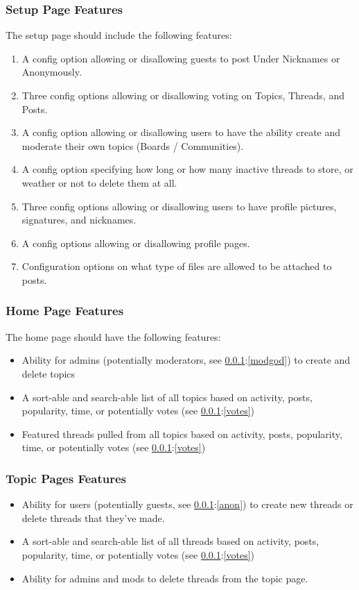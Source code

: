 \documentclass[]{article}
\begin{document}
\subsubsection{Setup Page Features}\label{setup}
The setup page should include the following features:
\begin{enumerate}
    \item \label{anon} A config option allowing or disallowing guests to post Under Nicknames or Anonymously.
    \item \label{votes} Three config options allowing or disallowing voting on Topics, Threads, and Posts.
    \item \label{modgod} A config option allowing or disallowing users to have the ability create and moderate their own topics (Boards / Communities).
    \item A config option specifying how long or how many inactive threads to store, or weather or not to delete them at all. 
    \item \label{custom} Three config options allowing or disallowing users to have profile pictures, signatures, and nicknames.
    \item \label{pfp} A config options allowing or disallowing profile pages.
    \item \label{attachments} Configuration options on what type of files are allowed to be attached to posts.
\end{enumerate}

\subsubsection{Home Page Features}
The home page should have the following features:
\begin{itemize}
    \item Ability for admins (potentially moderators, see \ref{setup}:\ref{modgod}) to create and delete topics
    \item A sort-able and search-able list of all topics based on activity, posts, popularity, time, or potentially votes (see \ref{setup}:\ref{votes}) 
    \item Featured threads pulled from all topics based on activity, posts, popularity, time, or potentially votes (see \ref{setup}:\ref{votes}) 
\end{itemize}

\subsubsection{Topic Pages Features}
\begin{itemize}
    \item Ability for users (potentially guests, see \ref{setup}:\ref{anon}) to create new threads or delete threads that they've made.
    \item A sort-able and search-able list of all threads based on activity, posts, popularity, time, or potentially votes (see \ref{setup}:\ref{votes}) 
    \item Ability for admins and mods to delete threads from the topic page.
\end{itemize}
\end{document}
